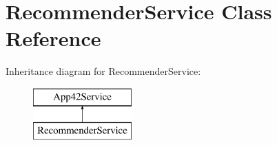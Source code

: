 \hypertarget{class_recommender_service}{\section{Recommender\+Service Class Reference}
\label{class_recommender_service}
}
Inheritance diagram for Recommender\+Service\+:\begin{figure}[H]
\begin{center}
\leavevmode
\includegraphics[height=2.000000cm]{class_recommender_service}
\end{center}
\end{figure}
